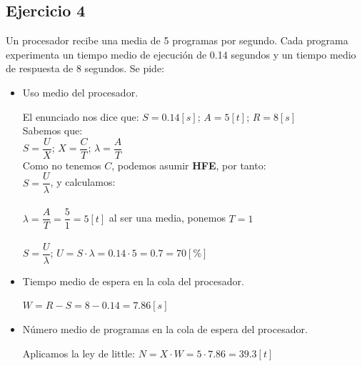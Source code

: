 \subsection{Ejercicio 4}
Un procesador recibe una media de 5 programas por segundo. Cada programa experimenta un tiempo medio de ejecución de 0.14 segundos y un tiempo medio de respuesta de 8 segundos. Se pide:
\begin{itemize}
    \item Uso medio del procesador.
    \begin{tcolorbox}[colback=white,colframe=cyan!50!black,fonttitle=\bfseries]
    El enunciado nos dice que: $S=0.14[s]$; $A=5[t]$; $R=8[s]$\\
    Sabemos que: \\
    $S =\dfrac{U}{X}$;  $X = \dfrac{C}{T}$; $\lambda = \dfrac{A}{T}$\\
    Como no tenemos $C$, podemos asumir \textbf{HFE}, por tanto:\\
    $S =\dfrac{U}{\lambda}$, y calculamos:\\\\
    $\lambda = \dfrac{A}{T} = \dfrac{5}{1} = 5[t]$ al ser una media, ponemos $T=1$\\\\
    $S =\dfrac{U}{\lambda}$; $U = S \cdot \lambda = 0.14\cdot5=0.7=70[\%]$ 
    \end{tcolorbox}
    \item Tiempo medio de espera en la cola del procesador.
    \begin{tcolorbox}[colback=white,colframe=cyan!50!black,fonttitle=\bfseries]
    $W = R-S= 8-0.14 = 7.86[s]$
    \end{tcolorbox}
    \item Número medio de programas en la cola de espera del procesador.
    \begin{tcolorbox}[colback=white,colframe=cyan!50!black,fonttitle=\bfseries]
    Aplicamos la ley de little:
    $N=X\cdot W=5\cdot7.86=39.3[t]$
    \end{tcolorbox}
\end{itemize}

